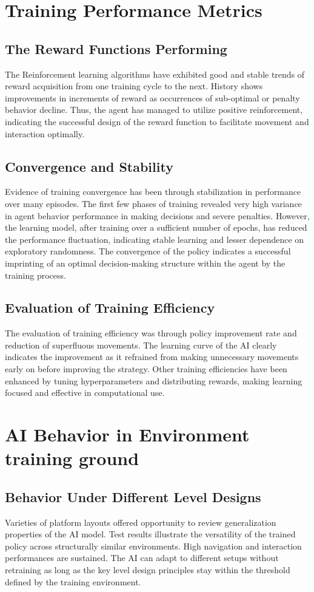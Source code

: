 \documentclass[12pt,oneside,openright,a4paper]{cpe-english-project}
\begin{document}
\section{Training Performance Metrics}
\subsection{The Reward Functions Performing}
The Reinforcement learning algorithms have exhibited good and stable trends of reward acquisition from one training cycle to the next. History shows improvements in increments of reward as occurrences of sub-optimal or penalty behavior decline. Thus, the agent has managed to utilize positive reinforcement, indicating the successful design of the reward function to facilitate movement and interaction optimally.
\subsection{Convergence and Stability}
Evidence of training convergence has been through stabilization in performance over many episodes. The first few phases of training revealed very high variance in agent behavior performance in making decisions and severe penalties. However, the learning model, after training over a sufficient number of epochs, has reduced the performance fluctuation, indicating stable learning and lesser dependence on exploratory randomness. The convergence of the policy indicates a successful imprinting of an optimal decision-making structure within the agent by the training process.
\subsection{Evaluation of Training Efficiency}
The evaluation of training efficiency was through policy improvement rate and reduction of superfluous movements. The learning curve of the AI clearly indicates the improvement as it refrained from making unnecessary movements early on before improving the strategy. Other training efficiencies have been enhanced by tuning hyperparameters and distributing rewards, making learning focused and effective in computational use.
\section{AI Behavior in Environment training ground}
\subsection{Behavior Under Different Level Designs}
Varieties of platform layouts offered opportunity to review generalization properties of the AI model. Test results illustrate the versatility of the trained policy across structurally similar environments. High navigation and interaction performances are sustained. The AI can adapt to different setups without retraining as long as the key level design principles stay within the threshold defined by the training environment.
\end{document}
